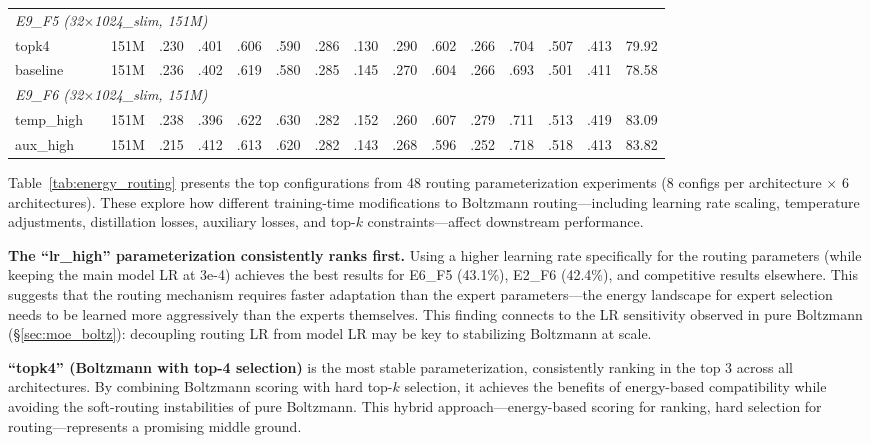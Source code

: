 \documentclass[oneside]{article}
\begin{document}
\begin{table}[t]
\begin{adjustbox}{max width=\textwidth}
\begin{tabular}{l|l|l|ccccccccccc|c|c}
\midrule
\multicolumn{15}{l}{\textit{E9\_F5 (32$\times$1024\_slim, 151M)}} \\
topk4           & & 151M & .230 & .401 & .606 & .590 & .286 & .130 & .290 & .602 & .266 & .704 & .507 & .413 & 79.92 \\
baseline        & & 151M & .236 & .402 & .619 & .580 & .285 & .145 & .270 & .604 & .266 & .693 & .501 & .411 & 78.58 \\
\midrule
\multicolumn{15}{l}{\textit{E9\_F6 (32$\times$1024\_slim, 151M)}} \\
temp\_high      & & 151M & .238 & .396 & .622 & .630 & .282 & .152 & .260 & .607 & .279 & .711 & .513 & .419 & 83.09 \\
aux\_high       & & 151M & .215 & .412 & .613 & .620 & .282 & .143 & .268 & .596 & .252 & .718 & .518 & .413 & 83.82 \\
\bottomrule
\end{tabular}
\end{adjustbox}
\end{table}

Table~\ref{tab:energy_routing} presents the top configurations from 48 routing parameterization experiments (8 configs per architecture $\times$ 6 architectures). These explore how different training-time modifications to Boltzmann routing---including learning rate scaling, temperature adjustments, distillation losses, auxiliary losses, and top-$k$ constraints---affect downstream performance.

\textbf{The ``lr\_high'' parameterization consistently ranks first.} Using a higher learning rate specifically for the routing parameters (while keeping the main model LR at 3e-4) achieves the best results for E6\_F5 (43.1\%), E2\_F6 (42.4\%), and competitive results elsewhere. This suggests that the routing mechanism requires faster adaptation than the expert parameters---the energy landscape for expert selection needs to be learned more aggressively than the experts themselves. This finding connects to the LR sensitivity observed in pure Boltzmann (\S\ref{sec:moe_boltz}): decoupling routing LR from model LR may be key to stabilizing Boltzmann at scale.

\textbf{``topk4'' (Boltzmann with top-4 selection)} is the most stable parameterization, consistently ranking in the top 3 across all architectures. By combining Boltzmann scoring with hard top-$k$ selection, it achieves the benefits of energy-based compatibility while avoiding the soft-routing instabilities of pure Boltzmann. This hybrid approach---energy-based scoring for ranking, hard selection for routing---represents a promising middle ground.
\end{document}
